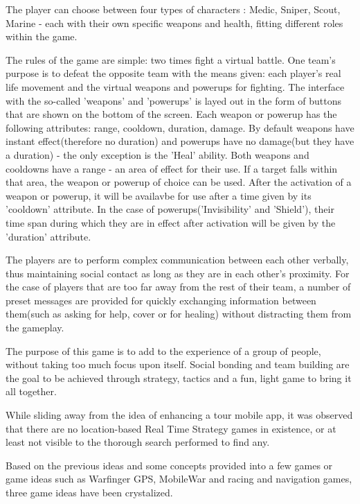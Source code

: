 The player can choose between four types of characters : Medic, Sniper, Scout,
Marine - each with their own specific weapons and health, fitting different
roles within the game.\newline

The rules of the game are simple: two times fight a virtual battle. One team's
purpose is to defeat the opposite team with the means given: each player's real
life movement and the virtual weapons and powerups for fighting. The interface
with the so-called 'weapons' and 'powerups' is layed out in the form of buttons
that are shown on the bottom of the screen. Each weapon or powerup has the
following attributes: range, cooldown, duration, damage. By default weapons have
instant effect(therefore no duration) and powerups have no damage(but they have
a duration) - the only exception is the 'Heal' ability. Both weapons and
cooldowns have a range - an area of effect for their use. If a target falls
within that area, the weapon or powerup of choice can be used. After the
activation of a weapon or powerup, it will be availavbe for use after a time
given by its 'cooldown' attribute. In the case of powerups('Invisibility' and
'Shield'), their time span during which they are in effect after activation will
be given by the 'duration' attribute. \newline

The players are to perform complex communication between each other verbally,
thus maintaining social contact as long as they are in each other's proximity.
For the case of players that are too far away from the rest of their team, a
number of preset messages are provided for quickly exchanging information
between them(such as asking for help, cover or for healing) without distracting
them from the gameplay.\newline

The purpose of this game is to add to the experience of a group of people,
without taking too much focus upon itself. Social bonding and team building are
the goal to be achieved through strategy, tactics and a fun, light game to bring
it all together.\newline

While sliding away from the idea of enhancing a tour mobile app, it was observed
that there are no location-based Real Time Strategy games in existence, or at
least not visible to the thorough search performed to find any.\newline

Based on the previous ideas and some concepts provided into a few games or game
ideas such as Warfinger GPS, MobileWar and racing and navigation games, three
game ideas have been crystalized.\newline 

